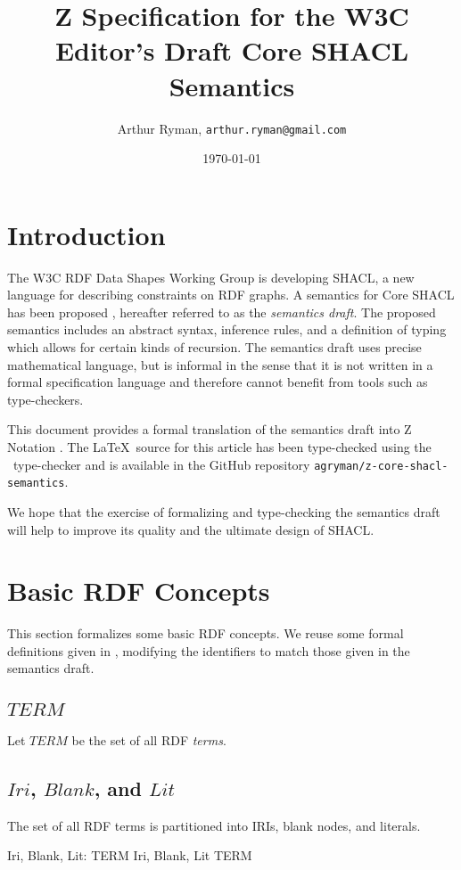 \documentclass{article}
\title{Z Specification for the W3C Editor's Draft Core SHACL Semantics}
\author{Arthur Ryman, {\tt arthur.ryman@gmail.com}}
\date{\today}
\begin{document}


\maketitle


\section{Introduction}
\label{sec-introduction}
The W3C RDF Data Shapes Working Group \cite{w3c:shapeswg} is developing SHACL, a new language for describing constraints on RDF graphs.
A semantics for Core SHACL has been proposed \cite{iovka:core-shacl}, hereafter referred to as the {\em semantics draft}.
The proposed semantics includes an abstract syntax, inference rules, and a definition of typing which allows for certain kinds of recursion.
The semantics draft uses precise mathematical language, but is informal in the sense that it is not written in a formal specification language
and therefore cannot benefit from tools such as type-checkers.

This document provides a formal translation of the semantics draft into Z Notation  \cite{spivey:zrm}.
The \LaTeX\ source for this article has been type-checked using the \fuzz\ type-checker \cite{spivey:fuzz}
and is available in the GitHub repository  \cite{agryman:z-core-shacl-semantics}
{\tt agryman/z-core-shacl-semantics}.

We hope that the exercise of formalizing and type-checking the semantics draft will help to improve its quality
and the ultimate design of SHACL. 

\section{Basic RDF Concepts}
\label{sec-basic-rdf-concepts}
This section formalizes some basic RDF concepts.
We reuse some formal definitions given in \cite{arthur:recursion}, modifying the identifiers to match those given in the semantics draft.

\subsection{$TERM$}
Let $TERM$ be the set of all RDF {\em terms}.
\begin{zed}
	[TERM]
\end{zed}

\subsection{$Iri$, $Blank$, and $Lit$}
The set of all RDF terms is partitioned into IRIs, blank nodes, and literals.
\begin{axdef}
	Iri, Blank, Lit: \power TERM
\where
	\langle Iri, Blank, Lit \rangle \partition TERM
\end{axdef}
\end{document}
